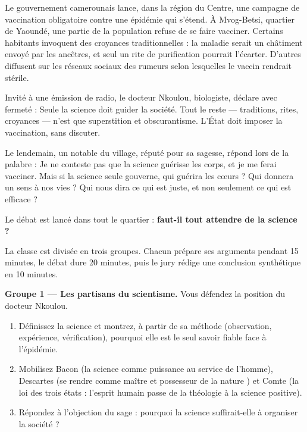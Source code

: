 \documentclass[11pt]{article}
\newcounter{popsec}
\newcounter{popsub}
\newcommand{\courssub}[1]{%
  \stepcounter{popsub}%
  \par\vspace{9pt}\noindent{\popxbold\fontsize{11.5}{13}\selectfont\color{popink}{\color{poporange}\thepopsec.\thepopsub}\hspace{6pt}#1}\par\nopagebreak\vspace{4pt}
}
\begin{document}
\courssub{Situation}

\begin{exemplebox}
Le gouvernement camerounais lance, dans la région du Centre, une campagne de vaccination obligatoire contre une épidémie qui s'étend. À Mvog-Betsi, quartier de Yaoundé, une partie de la population refuse de se faire vacciner. Certains habitants invoquent des croyances traditionnelles : la maladie serait un châtiment envoyé par les ancêtres, et seul un rite de purification pourrait l'écarter. D'autres diffusent sur les réseaux sociaux des rumeurs selon lesquelles le vaccin rendrait stérile.

Invité à une émission de radio, le docteur Nkoulou, biologiste, déclare avec fermeté : \guillemotleft Seule la science doit guider la société. Tout le reste --- traditions, rites, croyances --- n'est que superstition et obscurantisme. L'État doit imposer la vaccination, sans discuter. \guillemotright

Le lendemain, un notable du village, réputé pour sa sagesse, répond lors de la palabre : \guillemotleft Je ne conteste pas que la science guérisse les corps, et je me ferai vacciner. Mais si la science seule gouverne, qui guérira les cœurs ? Qui donnera un sens à nos vies ? Qui nous dira ce qui est juste, et non seulement ce qui est efficace ? \guillemotright

Le débat est lancé dans tout le quartier : \textbf{faut-il tout attendre de la science ?}
\end{exemplebox}

\courssub{Consignes}

La classe est divisée en trois groupes. Chacun prépare ses arguments pendant 15 minutes, le débat dure 20 minutes, puis le jury rédige une conclusion synthétique en 10 minutes.

\textbf{Groupe 1 --- Les partisans du scientisme.} Vous défendez la position du docteur Nkoulou.

\begin{enumerate}
\item Définissez la science et montrez, à partir de sa méthode (observation, expérience, vérification), pourquoi elle est le seul savoir fiable face à l'épidémie.
\item Mobilisez Bacon (la science comme puissance au service de l'homme), Descartes (se rendre \guillemotleft comme maître et possesseur de la nature \guillemotright) et Comte (la loi des trois états : l'esprit humain passe de la théologie à la science positive).
\item Répondez à l'objection du sage : pourquoi la science suffirait-elle à organiser la société ?
\end{enumerate}
\end{document}
